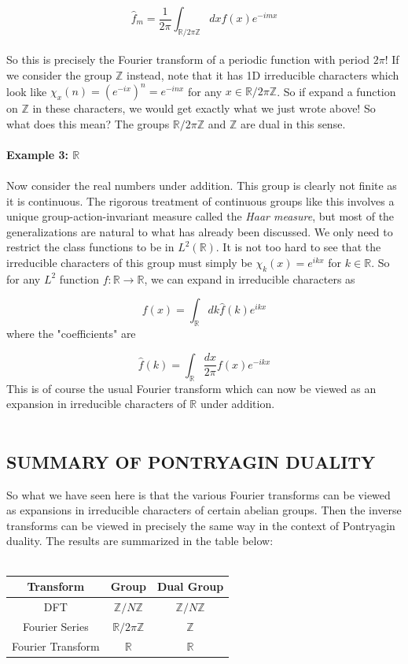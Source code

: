 \documentclass[9 pt]{report}
\begin{document}
$$ \hat{f}_m  = \frac{1}{2\pi}\int_{\mathbb{R}/2\pi\mathbb{Z}} dx f(x)e^{-i m x}$$
\\
So this is precisely the Fourier transform of a periodic function with period $2\pi$! If we consider the group $\mathbb{Z}$ instead, note that it has 1D irreducible characters which look like $\chi_x(n)=(e^{-i x})^n=e^{-in x}$ for any $x\in\mathbb{R}/2\pi\mathbb{Z}$. So if expand a function on $\mathbb{Z}$ in these characters, we would get exactly what we just wrote above! So what does this mean? The groups $\mathbb{R}/2\pi\mathbb{Z}$ and $\mathbb{Z}$ are dual in this sense. 
\\
\\
\textbf{Example 3: $\mathbb{R}$}
\\
\\
Now consider the real numbers under addition. This group is clearly not finite as it is continuous. The rigorous treatment of continuous groups like this involves a unique group-action-invariant measure called the \textit{Haar measure}, but most of the generalizations are natural to what has already been discussed. We only need to restrict the class functions to be in $L^2(\mathbb{R})$. It is not too hard to see that the irreducible characters of this group must simply be $\chi_k(x)=e^{ikx}$ for $k\in \mathbb{R}$. So for any $L^2$ function $f:\mathbb{R}\to \mathbb{R}$, we can expand in irreducible characters as

$$ f(x) = \int_{\mathbb{R}} dk\hat{f}(k)e^{ikx} $$
where the "coefficients" are 

$$ \hat{f}(k) = \int_\mathbb{R} \frac{dx}{2\pi}f(x)e^{-ikx} $$
This is of course the usual Fourier transform which can now be viewed as an expansion in irreducible characters of $\mathbb{R}$ under addition. 
\\
\\

{\centering
\subsection*{SUMMARY OF PONTRYAGIN DUALITY}}
So what we have seen here is that the various Fourier transforms can be viewed as expansions in irreducible characters of certain abelian groups. Then the inverse transforms can be viewed in precisely the same way in the context of Pontryagin duality. The results are summarized in the table below:
\\
\\
\begin{center}
	\begin{tabular}{|c|c|c|}
		\hline
		\textbf{Transform} & \textbf{Group} & \textbf{Dual Group} \\
		\hline
		DFT & $\mathbb{Z}/N\mathbb{Z}$ & $\mathbb{Z}/N\mathbb{Z}$ \\
		\hline
		Fourier Series & $\mathbb{R}/2\pi\mathbb{Z}$ & $\mathbb{Z}$ \\
		\hline
		Fourier Transform & $\mathbb{R}$ & $\mathbb{R}$ \\
		\hline
	\end{tabular}
\end{center}
\end{document}
